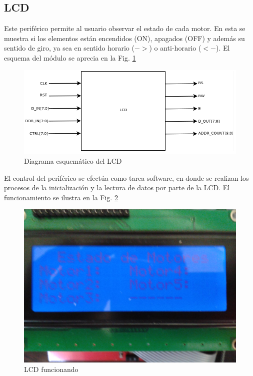 \documentclass[twocolumn]{IEEEtran}
\begin{document}
\subsection{LCD}
\noindent
Este periférico permite al usuario observar el estado de cada motor. En esta se muestra si los elementos están encendidos (ON), apagados (OFF) y además su sentido de giro, ya sea en sentido horario ($->$) o anti-horario ($<-$).  El esquema del módulo se aprecia en la Fig. \ref{fig8}
\begin{figure}[H]
	\centering
		\includegraphics[scale=0.45]{lcd.png}
	\caption{Diagrama esquemático del LCD}
	\label{fig8}
\end{figure} 
\noindent
El control del periférico se efectúa como tarea software, en donde se realizan los procesos de la inicialización y la lectura de datos por parte de la LCD. El funcionamiento se ilustra en la Fig. \ref{fig9}
\begin{figure}[H]
	\centering
		\includegraphics[scale=0.15]{lcd2.png}
	\caption{LCD funcionando}
	\label{fig9}
\end{figure} 
\end{document}
